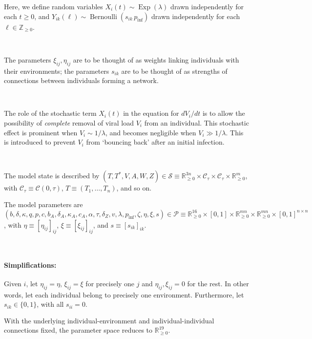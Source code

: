 \documentclass[11pt]{article}
\numberwithin{equation}{subsection}
\begin{document}
    Here, we define random variables $X_i(t) \sim
    \operatorname{Exp}(\lambda)$ drawn independently for each $t \geq 0$, and
    $Y_{ik}(\ell) \sim \operatorname{Bernoulli}(s_{ik} \, p_\text{inf})$ drawn
    independently for each $\ell \in \mathbb{Z}_{\geq 0}$.

    ~

    The parameters $\xi_{ij}, \eta_{ij}$ are to be thought of as weights
    linking individuals with their environments; the parameters $s_{ik}$ are
    to be thought of as strengths of connections between individuals forming a
    network.

    ~

    The role of the stochastic term $X_i(t)$ in the equation for $dV_i / dt$
    is to allow the possibility of \textit{complete} removal of viral load
    $V_i$ from an individual. This stochastic effect is prominent when $V_i
    \sim 1/\lambda$, and becomes negligible when $V_i \gg 1 / \lambda$.  This
    is introduced to prevent $V_i$ from `bouncing back' after an initial
    infection.

    ~

    The model state is described by $(T, T^*, V, A, W, Z) \in \mathcal{S}
    \equiv \mathbb{R}_{\geq 0}^{3n} \times \mathcal{C}_\tau \times
    \mathcal{C}_\tau \times \mathbb{R}_{\geq 0}^{m}$, with $\mathcal{C}_\tau
    \equiv \mathcal{C}(0, \tau)$, $T \equiv (T_1, \dots, T_n)$, and so on.

    The model parameters are $(b, \delta, \kappa, q, p, c, b_A, \delta_A,
    \kappa_A, c_A, \alpha, \tau, \delta_Z, v, \lambda, p_\text{inf}, \zeta,
    \eta, \xi, s) \in \mathcal{P} \equiv \mathbb{R}_{\geq 0}^{16} \times
    [0, 1] \times \mathbb{R}_{\geq 0}^{mn} \times \mathbb{R}_{\geq 0}^{mn}
    \times [0, 1]^{n\times n}$, with $\eta \equiv [\eta_{ij}]_{ij}$, $\xi
    \equiv [\xi_{ij}]_{ij}$, and $s \equiv [s_{ik}]_{ik}$.

    ~

    \paragraph{Simplifications:} Given $i$, let $\eta_{ij} = \eta$, $\xi_{ij}
    = \xi$ for precisely one $j$ and $\eta_{ij}, \xi_{ij} = 0$ for the rest.
    In other words, let each individual belong to precisely one environment.
    Furthermore, let $s_{ik} \in \{0, 1\}$, with all $s_{ii} = 0$.

    With the underlying individual-environment and individual-individual
    connections fixed, the parameter space reduces to $\mathbb{R}_{\geq
    0}^{19}$.
\end{document}
